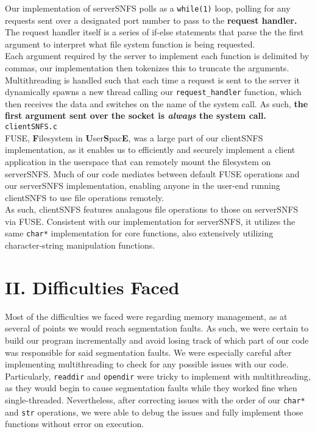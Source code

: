 \documentclass[10pt]{article}
\begin{document}
Our implementation of serverSNFS polls as a \texttt{while(1)} loop, 
polling for any requests sent over a designated port number to pass to the \textbf{request handler.} 
The request handler itself is a series of if-else statements that parse the the first 
argument to interpret what file system function is being requested.  \\

Each argument required by the server to implement each function is delimited by commas, 
our implementation then tokenizes this to truncate the arguments. \\

Multithreading is handled such that each time a request is sent to the server it 
dynamically spawns a new thread calling our \texttt{request\_handler} function, which 
then receives the data and switches on the name of the system call. As such, \textbf{the first 
argument sent over the socket is \textit{always} the system call.} \\

\texttt{clientSNFS.c} \\

FUSE, \textbf{F}ilesystem in \textbf{U}ser\textbf{S}pac\textbf{E}, was a large part of our 
clientSNFS implementation, as it enables us to efficiently and securely implement a client 
application in the userspace that can remotely mount the filesystem on serverSNFS. Much of our 
code mediates between default FUSE operations and our serverSNFS implementation, enabling 
anyone in the user-end running clientSNFS to use file operations remotely. \\

As such, clientSNFS features analagous file operations to those on serverSNFS via FUSE. Consistent 
with our implementation for serverSNFS, it utilizes the same \texttt{char*} implementation for 
core functions, also extensively utilizing character-string manipulation functions.    

\newpage

\section{II. Difficulties Faced}

Most of the difficulties we faced were regarding memory management, as at several of points we would 
reach segmentation faults. As such, we were certain to build our program incrementally and avoid 
losing track of which part of our code was responsible for said segmentation faults. We were especially 
careful after implementing multithreading to check for any possible issues with our code. Particularly, 
\texttt{readdir} and \texttt{opendir} were tricky to implement with multithreading, as they would begin 
to cause segmentation faults while they worked fine when single-threaded. Nevertheless, after correcting 
issues with the order of our \texttt{char*} and \texttt{str} operations, we were able to debug the issues 
and fully implement those functions without error on execution. \\ 
\end{document}
